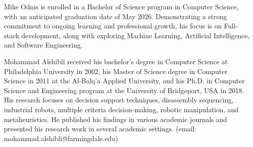 \documentclass[journal, biblatex]{IEEEtran}
\begin{document}
\listoffigures

\printbibliography[
    heading=bibintoc,
    title={References},
]%

\begin{IEEEbiography}
{Mike Odnis} is enrolled in a Bachelor of Science program in Computer Science, with an anticipated graduation date of May 2026. Demonstrating a strong commitment to ongoing learning and professional growth, his focus is on Full-stack development, along with exploring Machine Learning, Artificial Intelligence, and Software Engineering.
\end{IEEEbiography}
\begin{IEEEbiography}{Mohammad Alshibli} received his bachelor's degree in Computer Science at Philadelphia University in 2002, his Master of Science degree in Computer Science in 2011 at the Al-Balq’a Applied University, and his Ph.D. in Computer Science and Engineering program at the University of Bridgeport, USA in 2018. His research focuses on decision support techniques, disassembly sequencing, industrial robots, multiple criteria decision-making, robotic manipulation, and metaheuristics. He published his findings in various academic journals and presented his research work in several academic settings. (email: mohammad.alshibli@farmingdale.edu)
\end{IEEEbiography}
\end{document}
